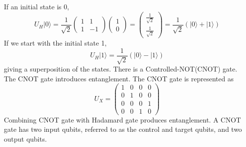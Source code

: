 \documentclass{Assignment}
\begin{document}
If an initial state is 0, 
\begin{equation}
	U_H|0\rangle = \frac{1}{\sqrt{2}}
	\begin{pmatrix}
		1&1\\1&-1
	\end{pmatrix}\begin{pmatrix}
		1\\0
	\end{pmatrix}=\begin{pmatrix}
		\frac{1}{\sqrt{2}}\\
		\frac{1}{\sqrt{2}}
	\end{pmatrix}=\frac{1}{\sqrt{2}}(|0 \rangle + |1\rangle)
\end{equation} 
If we start with the initial state 1,
$$U_H|1\rangle = \frac{1}{\sqrt{2}}(|0 \rangle - |1\rangle)$$
giving a superposition of the states.
There is a Controlled-NOT(CNOT) gate.
\\
The CNOT gate introduces entanglement.
The CNOT gate is represented as 
\begin{equation}
	U_X = \begin{pmatrix}
		1&0&0&0\\
		0&1&0&0\\
		0&0&0&1\\
		0&0&1&0
	\end{pmatrix}
\end{equation}
Combining CNOT gate with Hadamard gate produces entanglement.
A CNOT gate has two input qubits, referred to as the control and target qubits, and two output qubits. \cite{mcintyre_quantum_2012}
\end{document}
